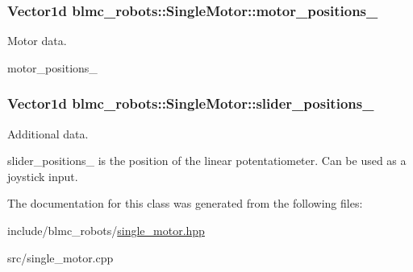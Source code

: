 \subsubsection[{\texorpdfstring{motor\+\_\+positions\+\_\+}{motor_positions_}}]{\setlength{\rightskip}{0pt plus 5cm}Vector1d blmc\+\_\+robots\+::\+Single\+Motor\+::motor\+\_\+positions\+\_\+\hspace{0.3cm}{\ttfamily [private]}}\hypertarget{classblmc__robots_1_1SingleMotor_a616badc749db3a0ce391ca154b602509}{}\label{classblmc__robots_1_1SingleMotor_a616badc749db3a0ce391ca154b602509}


Motor data. 

motor\+\_\+positions\+\_\+ 
\subsubsection[{\texorpdfstring{slider\+\_\+positions\+\_\+}{slider_positions_}}]{\setlength{\rightskip}{0pt plus 5cm}Vector1d blmc\+\_\+robots\+::\+Single\+Motor\+::slider\+\_\+positions\+\_\+\hspace{0.3cm}{\ttfamily [private]}}\hypertarget{classblmc__robots_1_1SingleMotor_a15774ca374fff212abe4d2b397263dc9}{}\label{classblmc__robots_1_1SingleMotor_a15774ca374fff212abe4d2b397263dc9}


Additional data. 

slider\+\_\+positions\+\_\+ is the position of the linear potentatiometer. Can be used as a joystick input. 

The documentation for this class was generated from the following files\+:\begin{DoxyCompactItemize}
\item 
include/blmc\+\_\+robots/\hyperlink{single__motor_8hpp}{single\+\_\+motor.\+hpp}\item 
src/single\+\_\+motor.\+cpp\end{DoxyCompactItemize}
